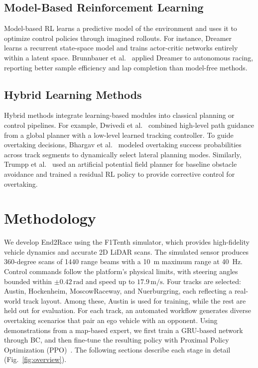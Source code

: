 \documentclass[letterpaper,10 pt,conference]{ieeeconf}
\begin{document}
\subsection{Model-Based Reinforcement Learning}

Model-based RL learns a predictive model of the environment and uses it to optimize control policies through imagined rollouts.
For instance, Dreamer~\cite{hafner2019dream} learns a recurrent state-space model and trains actor-critic networks entirely within a latent space.
Brunnbauer et al.~\cite{9811650} applied Dreamer to autonomous racing, reporting better sample efficiency and lap completion than model-free methods.

\subsection{Hybrid Learning Methods}

Hybrid methods integrate learning-based modules into classical planning or control pipelines.
For example, Dwivedi et al.~\cite{10003698} combined high-level path guidance from a global planner with a low-level learned tracking controller.
To guide overtaking decisions, Bhargav et al.~\cite{bhargav2021offline} modeled overtaking success probabilities across track segments to dynamically select lateral planning modes.
Similarly, Trumpp et al.~\cite{10801657} used an artificial potential field planner for baseline obstacle avoidance and trained a residual RL policy to provide corrective control for overtaking.

\section{Methodology}

We develop End2Race using the F1Tenth simulator, which provides high-fidelity vehicle dynamics and accurate 2D LiDAR scans.
The simulated sensor produces 360-degree scans of 1440 range beams with a 10~m maximum range at 40~Hz.
Control commands follow the platform's physical limits, with steering angles bounded within $\pm 0.42\,\text{rad}$ and speed up to $17.9\,\text{m/s}$.
Four tracks are selected: Austin, Hockenheim, MoscowRaceway, and Nuerburgring, each reflecting a real-world track layout.
Among these, Austin is used for training, while the rest are held out for evaluation.
For each track, an automated workflow generates diverse overtaking scenarios that pair an ego vehicle with an opponent.
Using demonstrations from a map-based expert, we first train a GRU-based network through BC, and then fine-tune the resulting policy with Proximal Policy Optimization (PPO)~\cite{ppo}.
The following sections describe each stage in detail (Fig.~\ref{fig:overview}).
\end{document}
